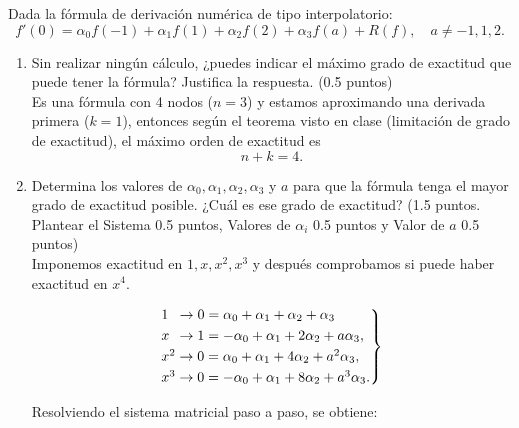 \documentclass[12pt]{article}
\begin{document}
    \begin{ejercicio}[4 puntos]
      Dada la fórmula de derivación numérica de tipo interpolatorio:
      \[
      f'(0) = \alpha_0 f(-1) + \alpha_1 f(1) + \alpha_2 f(2) + \alpha_3 f(a) + R(f), \quad a \neq -1, 1, 2.
      \]

      \begin{enumerate}
        \item Sin realizar ningún cálculo, ¿puedes indicar el máximo grado de exactitud que puede tener la fórmula? Justifica la respuesta. (0.5 puntos) \\

        Es una fórmula con 4 nodos ($n=3$) y estamos aproximando una derivada primera ($k=1$), entonces según el teorema visto en clase (limitación de grado de exactitud), el máximo orden de exactitud es
        \[
        n+k = 4.
        \]

        \item Determina los valores de \( \alpha_0, \alpha_1, \alpha_2, \alpha_3 \) y \( a \) para que la fórmula tenga el mayor grado de exactitud posible. ¿Cuál es ese grado de exactitud? (1.5 puntos. Plantear el Sistema 0.5 puntos, 
        Valores de $\alpha_i$ 0.5 puntos y Valor de $a$ 0.5 puntos) \\

        Imponemos exactitud en $1, x, x^2, x^3$ y después comprobamos si puede haber exactitud en $x^4$.

        \[
        \begin{rcases}
        1 \hspace{0.19cm} \to 0 = \alpha_0 + \alpha_1 + \alpha_2 + \alpha_3 \\
        x \hspace{0.16cm} \to 1 = -\alpha_0 + \alpha_1 + 2\alpha_2 + a\alpha_3, \\
        x^2 \to 0 = \alpha_0 + \alpha_1 + 4\alpha_2 + a^2 \alpha_3, \\
        x^3 \to 0 = -\alpha_0 + \alpha_1 + 8\alpha_2 + a^3 \alpha_3.
        \end{rcases}
        \]

        Resolviendo el sistema matricial paso a paso, se obtiene:


\end{enumerate}
\end{ejercicio}
\end{document}
